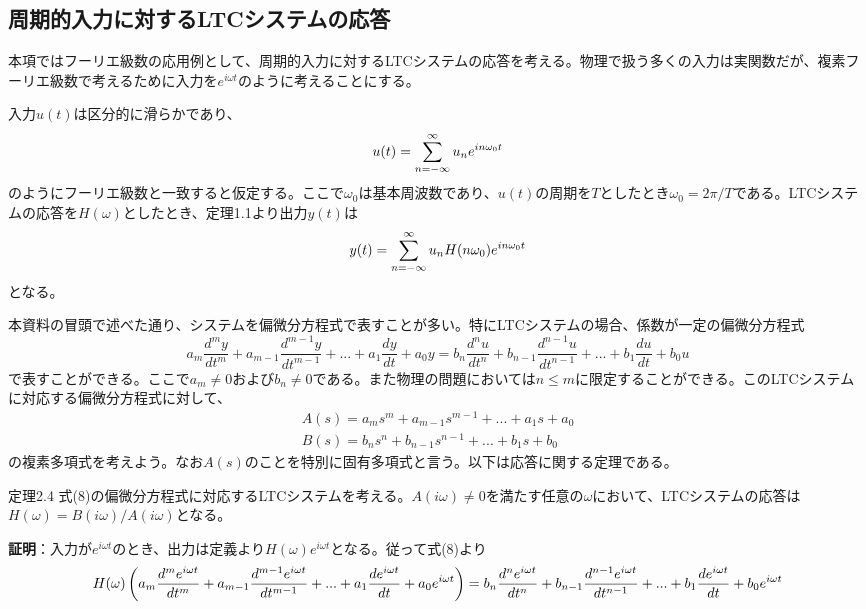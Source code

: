 \documentclass[dvipdfmx, 9pt, a4paper]{jsarticle}
\begin{document}
\subsection{周期的入力に対するLTCシステムの応答}
本項ではフーリエ級数の応用例として、周期的入力に対するLTCシステムの応答を考える。物理で扱う多くの入力は実関数だが、複素フーリエ級数で考えるために入力を$e^{i\omega t}$のように考えることにする。\par
入力$u(t)$は区分的に滑らかであり、
\begin{equation}
u(t)=\sum_{n=-\infty}^\infty u_n e^{in\omega_0t} \notag
\end{equation}
のようにフーリエ級数と一致すると仮定する。ここで$\omega_0$は基本周波数であり、$u(t)$の周期を$T$としたとき$\omega_0=2\pi/T$である。LTCシステムの応答を$H(\omega)$としたとき、定理1.1より出力$y(t)$は
\begin{equation}
y(t)=\sum_{n=-\infty}^\infty u_nH(n\omega_0) e^{in\omega_0t} \notag
\end{equation}
となる。\par
本資料の冒頭で述べた通り、システムを偏微分方程式で表すことが多い。特にLTCシステムの場合、係数が一定の偏微分方程式
\begin{equation}
a_m\frac{d^my}{dt^m}+a_{m-1}\frac{d^{m-1}y}{dt^{m-1}}+...+a_1\frac{dy}{dt}+a_0y=b_n\frac{d^nu}{dt^n}+b_{n-1}\frac{d^{n-1}u}{dt^{n-1}}+...+b_1\frac{du}{dt}+b_0u
\end{equation}
で表すことができる。ここで$a_m\neq 0$および$b_n \neq 0$である。また物理の問題においては$n \leq m$に限定することができる。このLTCシステムに対応する偏微分方程式に対して、
\begin{equation}
\begin{array}{l}
A(s)=a_ms^m+a_{m-1}s^{m-1}+...+a_1s+a_0 \\
B(s)=b_ns^n+b_{n-1}s^{n-1}+...+b_1s+b_0
\end{array}
\end{equation}
の複素多項式を考えよう。なお$A(s)$のことを特別に固有多項式と言う。以下は応答に関する定理である。
\begin{itembox}[l]{定理2.4}
式(8)の偏微分方程式に対応するLTCシステムを考える。$A(i\omega)\neq 0$を満たす任意の$\omega$において、LTCシステムの応答は$H(\omega)=B(i\omega)/A(i\omega)$となる。
\end{itembox}
{\bf 証明}：入力が$e^{i\omega t}$のとき、出力は定義より$H(\omega)e^{i\omega t}$となる。従って式(8)より
\begin{equation}
H(\omega)\left(a_m\frac{d^me^{i\omega t}}{dt^m}+a_{m-1}\frac{d^{m-1}e^{i\omega t}}{dt^{m-1}}+...+a_1\frac{de^{i\omega t}}{dt}+a_0e^{i\omega t}\right)=b_n\frac{d^ne^{i\omega t}}{dt^n}+b_{n-1}\frac{d^{n-1}e^{i\omega t}}{dt^{n-1}}+...+b_1\frac{de^{i\omega t}}{dt}+b_0e^{i\omega t} \notag
\end{equation}
\end{document}

